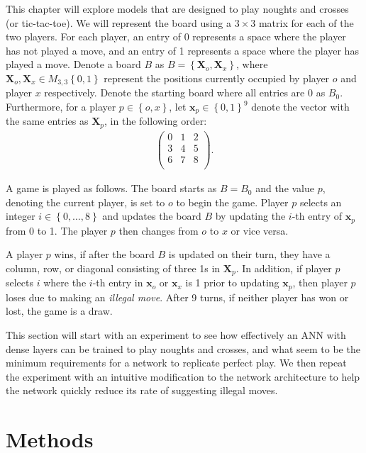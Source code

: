 \documentclass{somasmsc}
\begin{document}
This chapter will explore models that are designed to play noughts and crosses (or tic-tac-toe). We will represent the board using a $3 \times 3$ matrix for each of the two players. For each player, an entry of 0 represents a space where the player has not played a move, and an entry of 1 represents a space where the player has played a move. Denote a board $B$ as $B = \left\{\mathbf{X}_o, \mathbf{X}_x\right\}$, where $\mathbf{X}_o, \mathbf{X}_x \in M_{3,3}\left\{0,1\right\}$ represent the positions currently occupied by player $o$ and player $x$ respectively. Denote the starting board where all entries are 0 as $B_0$. Furthermore, for a player $p \in \left\{o, x\right\}$, let $\pmb{x}_p \in \left\{0,1\right\}^9$ denote the vector with the same entries as $\mathbf{X}_p$, in the following order:
\begin{align*}
    \begin{pmatrix}
        0 & 1 & 2 \\
        3 & 4 & 5 \\
        6 & 7 & 8 \\
    \end{pmatrix}.
\end{align*}

A game is played as follows. The board starts as $B = B_0$ and the value $p$, denoting the current player, is set to $o$ to begin the game. Player $p$ selects an integer $i \in \left\{0, \dots, 8\right\}$ and updates the board $B$ by updating the $i$-th entry of $\pmb{x}_p$ from 0 to 1. The player $p$ then changes from $o$ to $x$ or vice versa.

A player $p$ wins, if after the board $B$ is updated on their turn, they have a column, row, or diagonal consisting of three 1s in $\mathbf{X}_p$. In addition, if player $p$ selects $i$ where the $i$-th entry in $\pmb{x}_o$ or $\pmb{x}_x$ is 1 prior to updating $\pmb{x}_p$, then player $p$ loses due to making an \textit{illegal move}. After 9 turns, if neither player has won or lost, the game is a draw.

This section will start with an experiment to see how effectively an ANN with dense layers can be trained to play noughts and crosses, and what seem to be the minimum requirements for a network to replicate perfect play. We then repeat the experiment with an intuitive modification to the network architecture to help the network quickly reduce its rate of suggesting illegal moves.

\section{Methods}
\end{document}
